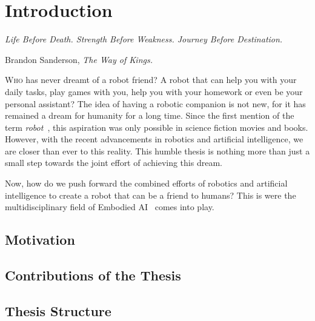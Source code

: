 \chapter{Introduction}\label{ch:introduction}

\setlength{}
\epigraph{\itshape Life Before Death. Strength Before Weakness. Journey Before Destination.}{Brandon Sanderson, \textit{The Way of Kings.}}
\lettrine{\textcolor{accent_color}{W}}{ho} has never dreamt of a robot friend?
A robot that can help you with your daily tasks, play games with you, help you with your homework or even be your personal assistant?
The idea of having a robotic companion is not new, for it has remained a dream for humanity for a long time.
Since the first mention of the term \textit{robot}~\cite{robot1920}, this aspiration was only possible in science fiction movies and books.
However, with the recent advancements in robotics and artificial intelligence, we are closer than ever to this reality.
This humble thesis is nothing more than just a small step towards the joint effort of achieving this dream.

Now, how do we push forward the combined efforts of robotics and artificial intelligence to create a robot that can be a friend to humans?
This is were the multidisciplinary field of Embodied AI~\cite{Liu2024AligningCS} comes into play.


\section{Motivation}\label{sec:motivation}


\section{Contributions of the Thesis}\label{sec:contributions-of-the-thesis}


\section{Thesis Structure}\label{sec:thesis-structure}